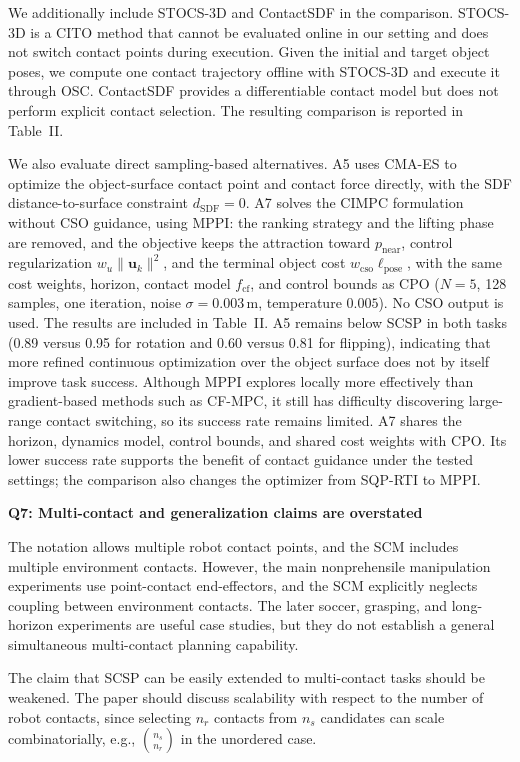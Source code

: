 \documentclass[journal,10pt]{IEEEtran}
\newcommand{\question}[2]{\par\smallskip\noindent
 \color{responseblue}\textbf{Q#1: #2}\par\nobreak\noindent\color{responseblue}}
\begin{document}
 We additionally include STOCS-3D and ContactSDF in the comparison. STOCS-3D is a CITO method that cannot be evaluated online in our setting and does not switch contact points during execution. Given the initial and target object poses, we compute one contact trajectory offline with STOCS-3D and execute it through OSC. ContactSDF provides a differentiable contact model but does not perform explicit contact selection. The resulting comparison is reported in Table~II.

We also evaluate direct sampling-based alternatives. A5 uses CMA-ES to optimize the object-surface contact point and contact force directly, with the SDF distance-to-surface constraint $d_{\mathrm{SDF}}=0$. A7 solves the CIMPC formulation without CSO guidance, using MPPI: the ranking strategy and the lifting phase are removed, and the objective keeps the attraction toward $p_{\mathrm{near}}$, control regularization $w_u\|\boldsymbol{u}_k\|^2$, and the terminal object cost $w_{\mathrm{cso}}\ell_{\mathrm{pose}}$, with the same cost weights, horizon, contact model $f_{\text{cf}}$, and control bounds as CPO ($N=5$, 128 samples, one iteration, noise $\sigma=0.003\,\mathrm{m}$, temperature $0.005$). No CSO output is used. The results are included in Table~II. A5 remains below SCSP in both tasks (0.89 versus 0.95 for rotation and 0.60 versus 0.81 for flipping), indicating that more refined continuous optimization over the object surface does not by itself improve task success. Although MPPI explores locally more effectively than gradient-based methods such as CF-MPC, it still has difficulty discovering large-range contact switching, so its success rate remains limited. A7 shares the horizon, dynamics model, control bounds, and shared cost weights with CPO. Its lower success rate supports the benefit of contact guidance under the tested settings; the comparison also changes the optimizer from SQP-RTI to MPPI.

\question{7}{Multi-contact and generalization claims are overstated}

The notation allows multiple robot contact points, and the SCM includes multiple environment contacts. However, the main nonprehensile manipulation experiments use point-contact end-effectors, and the SCM explicitly neglects coupling between environment contacts. The later soccer, grasping, and long-horizon experiments are useful case studies, but they do not establish a general simultaneous multi-contact planning capability.

The claim that SCSP can be easily extended to multi-contact tasks should be weakened. The paper should discuss scalability with respect to the number of robot contacts, since selecting $n_r$ contacts from $n_s$ candidates can scale combinatorially, e.g., $\binom{n_s}{n_r}$ in the unordered case.
\end{document}
